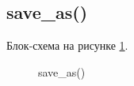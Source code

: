 \subsection{save\_as()}

Блок-схема на рисунке \ref{fig:save_as}.

\begin{figure}[p]
    \caption{save\_as()}
    \label{fig:save_as}
\end{figure}





\newpage